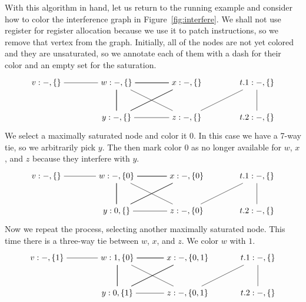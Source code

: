\documentclass[11pt]{book}
\begin{document}
With this algorithm in hand, let us return to the running example and
consider how to color the interference graph in
Figure~\ref{fig:interfere}. We shall not use register  for
register allocation because we use it to patch instructions, so we
remove that vertex from the graph.  Initially, all of the nodes are
not yet colored and they are unsaturated, so we annotate each of them
with a dash for their color and an empty set for the saturation.
\[
\begin{tikzpicture}[baseline=(current  bounding  box.center)]
\node (v) at (0,0)    {$v:-,\{\}$};
\node (w) at (3,0)    {$w:-,\{\}$};
\node (x) at (6,0)    {$x:-,\{\}$};
\node (y) at (3,-1.5) {$y:-,\{\}$};
\node (z) at (6,-1.5) {$z:-,\{\}$};
\node (t1) at (9,0)   {$t.1:-,\{\}$};
\node (t2) at (9,-1.5) {$t.2:-,\{\}$};

\draw (v) to (w);
\foreach \i in {w,x,y} 
{
  \foreach \j in {w,x,y}
  { 
    \draw (\i) to (\j);
  }
}
\draw (z) to (w);
\draw (z) to (y);
\draw (t1) to (z);
\draw (t2) to (t1);
\end{tikzpicture}
\]
We select a maximally saturated node and color it $0$. In this case we
have a 7-way tie, so we arbitrarily pick $y$. The then mark color $0$
as no longer available for $w$, $x$, and $z$ because they interfere
with $y$.
\[
\begin{tikzpicture}[baseline=(current  bounding  box.center)]
\node (v) at (0,0)    {$v:-,\{\}$};
\node (w) at (3,0)    {$w:-,\{0\}$};
\node (x) at (6,0)    {$x:-,\{0\}$};
\node (y) at (3,-1.5) {$y:0,\{\}$};
\node (z) at (6,-1.5) {$z:-,\{0\}$};
\node (t1) at (9,0)   {$t.1:-,\{\}$};
\node (t2) at (9,-1.5) {$t.2:-,\{\}$};
\draw (v) to (w);
\foreach \i in {w,x,y} 
{
  \foreach \j in {w,x,y}
  { 
    \draw (\i) to (\j);
  }
}
\draw (z) to (w);
\draw (z) to (y);
\draw (t1) to (z);
\draw (t2) to (t1);
\end{tikzpicture}
\]
Now we repeat the process, selecting another maximally saturated node.
This time there is a three-way tie between $w$, $x$, and $z$. We color
$w$ with $1$.
\[
\begin{tikzpicture}[baseline=(current  bounding  box.center)]
\node (v) at (0,0)    {$v:-,\{1\}$};
\node (w) at (3,0)    {$w:1,\{0\}$};
\node (x) at (6,0)    {$x:-,\{0,1\}$};
\node (y) at (3,-1.5) {$y:0,\{1\}$};
\node (z) at (6,-1.5) {$z:-,\{0,1\}$};
\node (t1) at (9,0)   {$t.1:-,\{\}$};
\node (t2) at (9,-1.5) {$t.2:-,\{\}$};
\draw (t1) to (z);
\draw (t2) to (t1);
\draw (v) to (w);
\foreach \i in {w,x,y} 
{
  \foreach \j in {w,x,y}
  { 
    \draw (\i) to (\j);
  }
}
\draw (z) to (w);
\draw (z) to (y);
\end{tikzpicture}
\]
\end{document}
